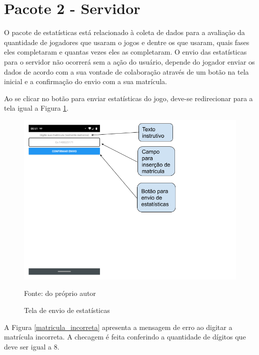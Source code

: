 \section[Pacote 2 - Servidor]{Pacote 2 - Servidor}
O pacote de estatísticas está relacionado à coleta de dados para a avaliação da quantidade de jogadores que usaram o jogos e dentre os que usaram, quais fases eles completaram e quantas vezes eles as completaram. O envio das estatísticas para o servidor não ocorrerá sem a ação do usuário, depende do jogador enviar os dados de acordo com a sua vontade de colaboração através de um botão na tela inicial e a confirmação do envio com a sua matrícula.

Ao se clicar no botão para enviar estatísticas do jogo, deve-se redirecionar para a tela igual a Figura \ref{envio_estatisticas}.


\begin{figure}[H]
\centering
\caption{Tela de envio de estatísticas}
\includegraphics[scale=0.5]{figuras/estatisticas/envio_estatisticas.png}

\label{envio_estatisticas}
\small{Fonte: do próprio autor}
\end{figure}

A Figura \ref{matricula_incorreta} apresenta a mensagem de erro ao digitar a matrícula incorreta. A checagem é feita conferindo a quantidade de dígitos que deve ser igual a 8.


